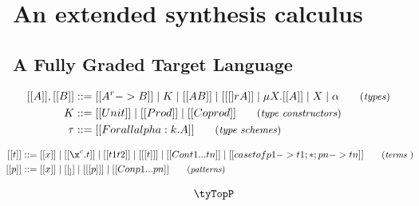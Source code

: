 \chapter{An extended synthesis calculus}
\label{chapter:extended}

\section{A Fully Graded Target Language}
\label{section:graded-base-typing}


\begin{align*}
    \hspace{-0.9em}[[ A ]] , [[ B ]] & ::=
           [[ A ^ r -> B ]]
      \mid K
      \mid [[ A B ]]
      \mid [[ [] r A ]]
      \mid \mu X . [[ A ]]
      \mid X
      \mid \alpha
    {\small{\tag{\textit{types}}}}
    \\[0em]
    \hspace{-0.9em} K & ::=
           [[ Unit ]]
      \mid [[ Prod ]]
      \mid [[ Coprod ]]
    {\small{\tag{\textit{type constructors}}}}
    \\[0em]
    \hspace{-0.9em} \tau & ::=
           [[ Forall alpha : k . A  ]]
    {\small{\tag{\textit{type schemes}}}}
\end{align*}

\begin{align*}
        \hspace{-0.8em} [[ t ]] ::= \;
               & [[ x ]]
          \mid [[ \x ^ c . t ]]
          \mid [[ t1 t2 ]]
          \mid [[ [t] ]]
          \mid [[ Con t1 ... tn ]]
          \mid [[ case t of p1 -> t1 ; * ; pn -> tn  ]]
        {\small{\tag{\textit{terms} }}}
                 \\
        \hspace{-0.8em} [[ p ]] ::= \;
               & [[ x ]]
          \mid [[ _ ]]
          \mid [[ [p] ]]
          \mid [[ Con p1 ... pn ]]
        {\small{\tag{\textit{patterns}}}}
\end{align*}

\begin{align*}
    \tyTopP
\end{align*}

